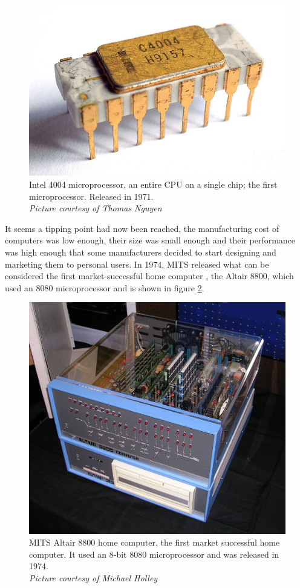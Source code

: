 \begin{figure} \begin{center}
\includegraphics[width=.3\linewidth]{pics/intel_4004} 
\end{center} 
\caption{Intel 4004 microprocessor, an entire CPU on a single chip; the first microprocessor. Released in 1971.\\ \textit{\small{Picture courtesy of Thomas Nguyen}}}
\label{Intel4004}
\end{figure} 

It seems a tipping point had now been reached, the manufacturing cost of computers was low enough, their size was small enough and their performance was high enough that some manufacturers decided to start designing and marketing them to personal users. In 1974, MITS released what can be considered the first market-successful home computer 
\cite{RN41}, the Altair 8800, which used an 8080 microprocessor and is shown in figure \ref{Altair8800}.

\begin{figure} \begin{center}
\includegraphics[width=.3\linewidth]{pics/altair_8800_computer} 
\end{center} 
\caption{MITS Altair 8800 home computer, the first market successful home computer. It used an 8-bit 8080 microprocessor and was released in 1974.\\ \textit{\small{Picture courtesy of Michael Holley}}}
\label{Altair8800}
\end{figure}

